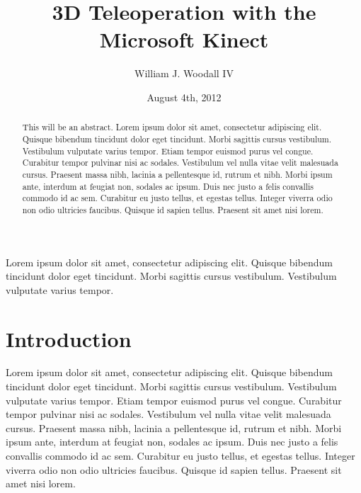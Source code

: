 \documentclass[12pt]{report}
\title{3D Teleoperation with the Microsoft Kinect}
\author{William J. Woodall IV}
\date{August 4th, 2012} %
\begin{document}

\begin{romanpages}      %

\TitlePage 

\begin{abstract} 
This will be an abstract. Lorem ipsum dolor sit amet, consectetur adipiscing elit. Quisque bibendum tincidunt dolor eget tincidunt. Morbi sagittis cursus vestibulum. Vestibulum vulputate varius tempor. Etiam tempor euismod purus vel congue. Curabitur tempor pulvinar nisi ac sodales. Vestibulum vel nulla vitae velit malesuada cursus. Praesent massa nibh, lacinia a pellentesque id, rutrum et nibh. Morbi ipsum ante, interdum at feugiat non, sodales ac ipsum. Duis nec justo a felis convallis commodo id ac sem. Curabitur eu justo tellus, et egestas tellus. Integer viverra odio non odio ultricies faucibus. Quisque id sapien tellus. Praesent sit amet nisi lorem.
\end{abstract}

\begin{acknowledgments}
Lorem ipsum dolor sit amet, consectetur adipiscing elit. Quisque bibendum tincidunt dolor eget tincidunt. Morbi sagittis cursus vestibulum. Vestibulum vulputate varius tempor.
\end{acknowledgments}

\tableofcontents
\listoffigures
\listoftables

\printnomenclature[0.5in] %
\end{romanpages}        %


\normalem       %


\chapter{Introduction}\label{chap:introduction}	
Lorem ipsum dolor sit amet, consectetur adipiscing elit. Quisque bibendum tincidunt dolor eget tincidunt. Morbi sagittis cursus vestibulum. Vestibulum vulputate varius tempor. Etiam tempor euismod purus vel congue. Curabitur tempor pulvinar nisi ac sodales. Vestibulum vel nulla vitae velit malesuada cursus. Praesent massa nibh, lacinia a pellentesque id, rutrum et nibh. Morbi ipsum ante, interdum at feugiat non, sodales ac ipsum. Duis nec justo a felis convallis commodo id ac sem. Curabitur eu justo tellus, et egestas tellus. Integer viverra odio non odio ultricies faucibus. Quisque id sapien tellus. Praesent sit amet nisi lorem.
\end{document}
